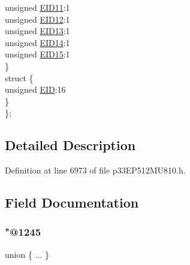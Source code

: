 \begin{DoxyCompactItemize}
\begin{tabbing}
\>\>unsigned \hyperlink{structtag_c2_r_x_f13_e_i_d_b_i_t_s_a710bdb0d602deb021b0be99066008018}{EID11}:1\\
\>\>unsigned \hyperlink{structtag_c2_r_x_f13_e_i_d_b_i_t_s_aa347bb85867bd8d4e0124f7cff8c6472}{EID12}:1\\
\>\>unsigned \hyperlink{structtag_c2_r_x_f13_e_i_d_b_i_t_s_a37d5f3edcbf6ef62f848fd4f3c584f79}{EID13}:1\\
\>\>unsigned \hyperlink{structtag_c2_r_x_f13_e_i_d_b_i_t_s_a7ffc0b0e0d99b8476b6f9a45337c17ab}{EID14}:1\\
\>\>unsigned \hyperlink{structtag_c2_r_x_f13_e_i_d_b_i_t_s_a293cd7dc1746257fa75a60cbd9383cd7}{EID15}:1\\
\>\} \\
\>struct \{\\
\>\>unsigned \hyperlink{structtag_c2_r_x_f13_e_i_d_b_i_t_s_ae80b378c9141f7c03e0b4e55b5f4b54d}{EID}:16\\
\>\} \\
\}; \\

\end{tabbing}\end{DoxyCompactItemize}


\subsection{Detailed Description}


Definition at line 6973 of file p33\+E\+P512\+M\+U810.\+h.



\subsection{Field Documentation}
\mbox{\label{structtag_c2_r_x_f13_e_i_d_b_i_t_s_a3232c7e7319c6559005453b42cef949a}} 
\subsubsection{\texorpdfstring{"@1245}{@1245}}
{\footnotesize\ttfamily union \{ ... \} }

\mbox{\label{structtag_c2_r_x_f13_e_i_d_b_i_t_s_ae80b378c9141f7c03e0b4e55b5f4b54d}} 
